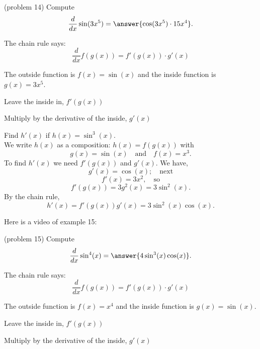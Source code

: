\documentclass[handout]{ximera}
\begin{document}
\begin{problem}(problem 14)
  Compute
  \[
  \frac{d}{dx} \sin(3x^5) = \answer{\cos(3x^5)\cdot 15x^4}.
  \]
  
    \begin{hint}
      The chain rule says:
      \[
      \frac{d}{dx} f(g(x)) = f'(g(x))\cdot g'(x)
      \]
    \end{hint}
    \begin{hint}
      The outside function is $f(x) = \sin(x)$ and the inside
      function is $g(x) = 3x^5$.
    \end{hint}
    \begin{hint}
		  Leave the inside in, $f'(g(x))$
		\end{hint}
		\begin{hint}
		  Multiply by the derivative of the inside, $g'(x)$
		\end{hint}
    
\end{problem}



\begin{example}[example 15]
Find $h'(x)$ if $h(x) = \sin^3(x)$.\\
We write $h(x)$ as a composition: $h(x)=f(g(x))$ with 
\[g(x) =\sin(x)   \quad \text{and} \quad  f(x) = x^3.\]
 To find $h'(x)$ we need $f'(g(x))$ and $g'(x)$.  We have, 
\[g'(x) =\cos(x); \quad \text{next} \] 
\[f'(x) = 3x^2, \quad \text{so}\] 
\[f'(g(x)) = 3g^2(x) = 3\sin^2(x).\]
By the chain rule,
\[h'(x) = f'(g(x))g'(x) =  3\sin^2(x)\cos(x).\]
\end{example}

Here is a video of example 15:
\begin{foldable}
\end{foldable}

 


\begin{problem}(problem 15)
  Compute
  \[
  \frac{d}{dx} \sin^4(x) = \answer{4\sin^3(x)\cos(x)}.
  \]
  
    \begin{hint}
      The chain rule says:
      \[
      \frac{d}{dx} f(g(x)) = f'(g(x))\cdot g'(x)
      \]
    \end{hint}
    \begin{hint}
      The outside function is $f(x) = x^4$ and the inside
      function is $g(x) = \sin(x)$.
    \end{hint}
    \begin{hint}
		  Leave the inside in, $f'(g(x))$
		\end{hint}
		\begin{hint}
		  Multiply by the derivative of the inside, $g'(x)$
		\end{hint}
    
\end{problem}
\end{document}
